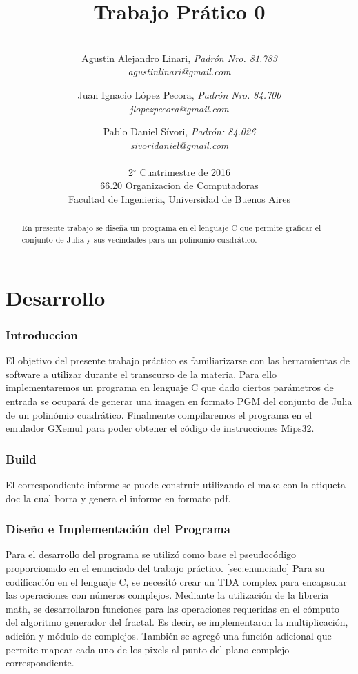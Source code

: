 \documentclass{article}
\title{Trabajo Prático 0}
\author{\\
  Agustin Alejandro Linari, \textit{Padrón Nro. 81.783}\\
  \textit{agustinlinari@gmail.com}\\
  \and
  Juan Ignacio López Pecora, \textit{Padrón Nro. 84.700}\\
  \textit{jlopezpecora@gmail.com}\\
  \and
  Pablo Daniel Sívori, \textit{Padrón: 84.026}\\
  \textit{sivoridaniel@gmail.com}\\
  \\
  \normalsize{2$^{\circ}$ Cuatrimestre de 2016}                           \\
  \normalsize{66.20 Organizacion de Computadoras}                  \\
  \normalsize{Facultad de Ingenieria, Universidad de Buenos Aires} \\
}
\begin{document}

\maketitle                   %

\begin{abstract}
En presente trabajo se diseña un programa en el lenguaje C que permite graficar el conjunto de Julia y sus vecindades para un polinomio cuadrático. 
\end{abstract}

\clearpage

\tableofcontents
\clearpage

\part{Desarrollo}

\section{Introduccion}

El objetivo del presente trabajo práctico es familiarizarse con las herramientas de software a utilizar durante el transcurso de la materia. Para ello implementaremos un programa en lenguaje C que dado ciertos parámetros de entrada se ocupará de generar una imagen en formato PGM del conjunto de Julia de un polinómio cuadrático. 
Finalmente compilaremos el programa en el emulador GXemul para poder obtener el código de instrucciones Mips32.

\section{Build}
El correspondiente informe se puede construir utilizando el make con la etiqueta doc la cual borra y genera el informe en formato pdf.

\section{Diseño e Implementación del Programa}
Para el desarrollo del programa se utilizó como base el pseudocódigo proporcionado en el enunciado del trabajo práctico. \ref{sec:enunciado}
Para su codificación en el lenguaje C, se necesitó crear un TDA complex para encapsular las operaciones con números complejos. Mediante la utilización de la libreria math, se desarrollaron funciones para las operaciones requeridas en el cómputo del algoritmo generador del fractal. Es decir, se implementaron la multiplicación, adición y módulo de complejos. También se agregó una función adicional que permite mapear cada uno de los pixels al punto del plano complejo correspondiente. 
\end{document}
